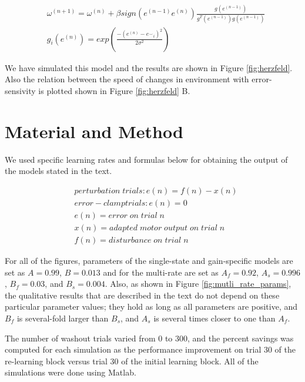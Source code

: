 \documentclass[9pt,twocolumn]{paper-template}
\begin{document}
\begin{eqnarray*}
& \omega^{(n+1)} = \omega^{(n)}+\beta sign(e^{(n-1)}e^{(n)}) \frac{g(e^{(n-1)})}{g^T(e^{(n-1)})g(e^{(n-1)})}\\
&g_i(e^{(n)}) = exp(\frac{-(e^{(n)}-{e^\smallsmile}_i)^2}{2\sigma^2})
\end{eqnarray*}

We have simulated this model and the results are shown in Figure \ref{fig:herzfeld}. Also the relation between the speed of changes in environment with error-sensivity is plotted shown in Figure \ref{fig:herzfeld} B. 

\section*{Material and Method}
We used specific learning rates and formulas below for obtaining the output of the models stated in the text.

\begin{eqnarray*}
& perturbation\;trials : e(n)=f(n)-x(n)\\
& error-clamp trials : e(n) = 0\\
& e(n) = error\;on\;trial\;n\\
& x(n) = adapted\;motor\;output\;on\;trial\;n\\
& f(n) = disturbance\;on\;trial\;n
\end{eqnarray*}

For all of the figures, parameters of the single-state and gain-specific models are set as $A=0.99$, $B=0.013$ and for the multi-rate are set as $A_f = 0.92$, $A_s = 0.996$, $B_f = 0.03$, and $B_s = 0.004$. Also, as shown in Figure \ref{fig:mutli_rate_params}, the qualitative results that are described in the text do not depend on these particular parameter values; they hold as long as all parameters are positive, and $B_f$ is several-fold larger than $B_s$, and $A_s$ is several times closer to one than $A_f$.

The number of washout trials varied from 0 to 300, and the percent savings was computed for each simulation as the performance improvement on trial 30 of the re-learning block versus trial 30 of the initial learning block. All of the simulations were done using Matlab.
\end{document}
